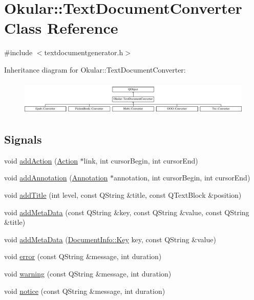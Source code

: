 \hypertarget{classOkular_1_1TextDocumentConverter}{\section{Okular\+:\+:Text\+Document\+Converter Class Reference}
\label{classOkular_1_1TextDocumentConverter}
}


{\ttfamily \#include $<$textdocumentgenerator.\+h$>$}

Inheritance diagram for Okular\+:\+:Text\+Document\+Converter\+:\begin{figure}[H]
\begin{center}
\leavevmode
\includegraphics[height=1.680000cm]{classOkular_1_1TextDocumentConverter}
\end{center}
\end{figure}
\subsection*{Signals}
\begin{DoxyCompactItemize}
\item 
void \hyperlink{classOkular_1_1TextDocumentConverter_ac4f1b668547e87affede3663ea6d8bc6}{add\+Action} (\hyperlink{classOkular_1_1Action}{Action} $\ast$link, int cursor\+Begin, int cursor\+End)
\item 
void \hyperlink{classOkular_1_1TextDocumentConverter_ab0291a2187c35bda6dd37c78e5642a1b}{add\+Annotation} (\hyperlink{classOkular_1_1Annotation}{Annotation} $\ast$annotation, int cursor\+Begin, int cursor\+End)
\item 
void \hyperlink{classOkular_1_1TextDocumentConverter_a054a6dbaad659387f26d239aa96d758d}{add\+Title} (int level, const Q\+String \&title, const Q\+Text\+Block \&position)
\item 
void \hyperlink{classOkular_1_1TextDocumentConverter_ad6e263857527273c9cf618e16329f6a7}{add\+Meta\+Data} (const Q\+String \&key, const Q\+String \&value, const Q\+String \&title)
\item 
void \hyperlink{classOkular_1_1TextDocumentConverter_ac55b8423eefdaa7e4ca7a4d49a5709bb}{add\+Meta\+Data} (\hyperlink{classOkular_1_1DocumentInfo_a3a6e5f7fb246e29bcb2e830b6f770791}{Document\+Info\+::\+Key} key, const Q\+String \&value)
\item 
void \hyperlink{classOkular_1_1TextDocumentConverter_a93f1335bdd8232626364c973d9d7e6b4}{error} (const Q\+String \&message, int duration)
\item 
void \hyperlink{classOkular_1_1TextDocumentConverter_a248e15ffea9a2a0fb1b863b29acab608}{warning} (const Q\+String \&message, int duration)
\item 
void \hyperlink{classOkular_1_1TextDocumentConverter_a3347d69fea6b76ab2024f56fac977940}{notice} (const Q\+String \&message, int duration)
\end{DoxyCompactItemize}
